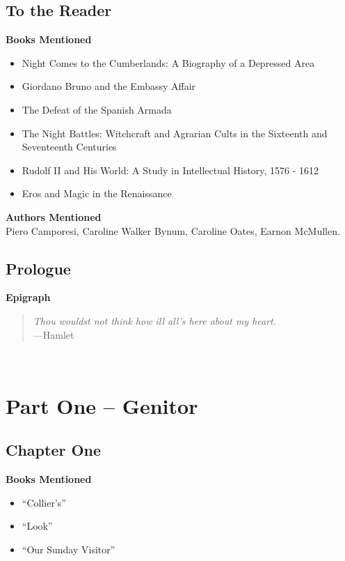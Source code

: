 \documentclass[12pt,makeidx]{extreport}
\newcommand\fleuron{\begin{turn}{45}\Large \ding{166}\end{turn}}
\newcommand\doublefleuron{%
	\reflectbox{\fleuron}\AC\staveXLIX\reflectbox{\AC}\fleuron}
\newcommand\fleuronbar{%
	{\huge\LinearACCCXIII}\xrfill[1.3ex]{1pt}\doublefleuron\xrfill[1.3ex]{1pt}\reflectbox{\huge\LinearACCCXIII}}
\newcommand\nbvspace[1][3]{\vspace*{\stretch{#1}}}
\begin{document}
\section{To the Reader}
\textbf{Books Mentioned}
\begin{itemize}
\item Night Comes to the Cumberlands: A Biography of a Depressed Area \parencite{Caudill1963}
\item Giordano Bruno and the Embassy Affair \parencite{Bossy1991}
\item The Defeat of the Spanish Armada \parencite{Mattingly1969}
\item The Night Battles: Witchcraft and Agrarian Cults in the Sixteenth and Seventeenth Centuries \parencite{Ginzburg1985}
\item Rudolf II and His World: A Study in Intellectual History, 1576 - 1612 \parencite{Evans1973}
\item Eros and Magic in the Renaissance \parencite{Culianu1987}
\end{itemize}



\hspace{-1.5em}\textbf{Authors Mentioned}\\
Piero Camporesi, Caroline Walker Bynum, Caroline Oates, Earnon McMullen.
\\


\section{Prologue}
\textbf{Epigraph}

\begin{quote}
\textit{Thou wouldst not think how ill all's here about my heart.}\\
---Hamlet
\end{quote}
\begin{center}
\vfill
\shadowoffset{1pt}
\shadowtext{%
{\color{Mahogany}\fontsize{50}{54}\Jupiter}}\\
\nbvspace[1]
\end{center}

\chapter{Part One -- Genitor}
\section{Chapter One}
\textbf{Books Mentioned}\\
\begin{itemize}
\item ``Collier’s'' \parencite{1952b}
\item ``Look'' \parencite{1952}
\item ``Our Sunday Visitor'' \parencite{1952a}
\end{itemize}
\end{document}
